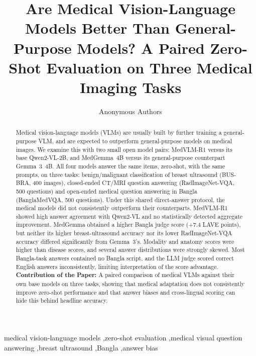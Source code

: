 \documentclass[doublecolumn]{ijcvsplatex}
\newcommand{\qwen}{Qwen2-VL}
\newcommand{\medvlm}{MedVLM-R1}
\newcommand{\gemma}{Gemma~3}
\newcommand{\medgemma}{MedGemma}
\begin{document}
\begin{frontmatter}

\title{Are Medical Vision-Language Models Better Than General-Purpose Models? A Paired Zero-Shot Evaluation on Three Medical Imaging Tasks}

\author{Anonymous Authors}
\address{Affiliation withheld for double-blind review}

\begin{abstract}
Medical vision-language models (VLMs) are usually built by further training a general-purpose VLM, and are expected to outperform general-purpose models on medical images. We examine this with two small open model pairs: \medvlm{} versus its base \qwen{}-2B, and \medgemma{}~4B versus its general-purpose counterpart \gemma{}~4B. All four models answer the same items, zero-shot, with the same prompts, on three tasks: benign/malignant classification of breast ultrasound (BUS-BRA, 400 images), closed-ended CT/MRI question answering (RadImageNet-VQA, 500 questions) and open-ended medical question answering in Bangla (BanglaMedVQA, 500 questions). Under this shared direct-answer protocol, the medical models did not consistently outperform their counterparts. \medvlm{} showed high answer agreement with \qwen{} and no statistically detected aggregate improvement. \medgemma{} obtained a higher Bangla judge score (+7.4 LAVE points), but neither its higher breast-ultrasound accuracy nor its lower RadImageNet-VQA accuracy differed significantly from \gemma{}'s. Modality and anatomy scores were higher than disease scores, and several answer distributions were strongly skewed. Most Bangla-task answers contained no Bangla script, and the LLM judge scored correct English answers inconsistently, limiting interpretation of the score advantage.
\\
\textbf{Contribution of the Paper:} A paired comparison of medical VLMs against their own base models on three tasks, showing that medical adaptation does not consistently improve zero-shot performance and that answer biases and cross-lingual scoring can hide this behind headline accuracy.
\end{abstract}

\begin{keyword}
medical vision-language models \sep zero-shot evaluation \sep medical visual question answering \sep breast ultrasound \sep Bangla \sep answer bias
\end{keyword}

\end{frontmatter}
\end{document}
